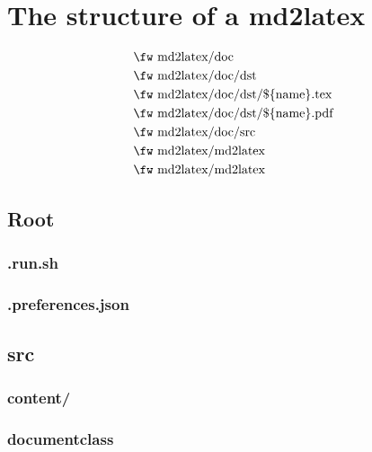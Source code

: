 \documentclass[a4paper, 11pt, titlepage, openany]{article}
\begin{document}
\section{The structure of a md2latex}

\begin{align} %
& \text{{\fw md2latex/doc}} \\
& \text{{\fw md2latex/doc/dst}} \\
& \text{{\fw md2latex/doc/dst/\$\{name\}.tex}} \\
& \text{{\fw md2latex/doc/dst/\$\{name\}.pdf}} \\
& \text{{\fw md2latex/doc/src}} \\
&\text{{\fw md2latex/md2latex}} \\
&\text{{\fw md2latex/md2latex}}
\end{align}

\subsection{Root}

\subsubsection{{\fw {}.run.sh}}

{}

\subsubsection{{\fw {}.preferences.json}}

{}

\subsection{{{\fw src}}}

{}

\subsubsection{{{\fw content/}}}

{}

\subsubsection{{{ \fw documentclass}}}
\end{document}
